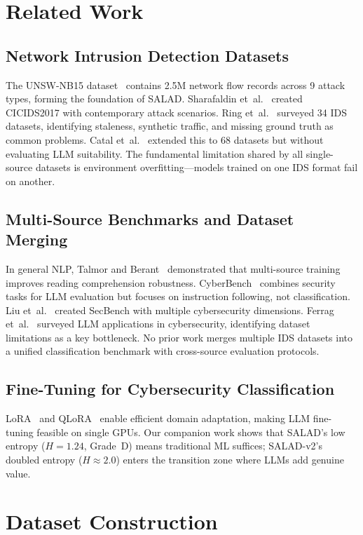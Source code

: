 \documentclass[journal]{IEEEtran}
\begin{document}
\section{Related Work}

\subsection{Network Intrusion Detection Datasets}
The UNSW-NB15 dataset~\cite{moustafa2016} contains 2.5M network flow records across 9 attack types, forming the foundation of SALAD. Sharafaldin et~al.~\cite{sharafaldin2018} created CICIDS2017 with contemporary attack scenarios. Ring et~al.~\cite{ring2019} surveyed 34 IDS datasets, identifying staleness, synthetic traffic, and missing ground truth as common problems. Catal et~al.~\cite{catal2022} extended this to 68 datasets but without evaluating LLM suitability. The fundamental limitation shared by all single-source datasets is environment overfitting---models trained on one IDS format fail on another.

\subsection{Multi-Source Benchmarks and Dataset Merging}
In general NLP, Talmor and Berant~\cite{talmor2019} demonstrated that multi-source training improves reading comprehension robustness. CyberBench~\cite{gupta2024} combines security tasks for LLM evaluation but focuses on instruction following, not classification. Liu et~al.~\cite{liu2024bench} created SecBench with multiple cybersecurity dimensions. Ferrag et~al.~\cite{ferrag2024} surveyed LLM applications in cybersecurity, identifying dataset limitations as a key bottleneck. No prior work merges multiple IDS datasets into a unified classification benchmark with cross-source evaluation protocols.

\subsection{Fine-Tuning for Cybersecurity Classification}
LoRA~\cite{hu2022} and QLoRA~\cite{dettmers2023} enable efficient domain adaptation, making LLM fine-tuning feasible on single GPUs. Our companion work shows that SALAD's low entropy ($H=1.24$, Grade~D) means traditional ML suffices; SALAD-v2's doubled entropy ($H\approx2.0$) enters the transition zone where LLMs add genuine value.

\section{Dataset Construction}
\end{document}
